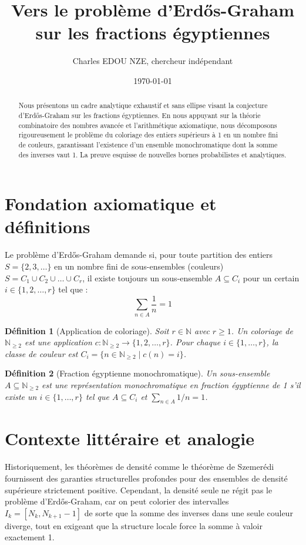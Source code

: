 \documentclass[12pt,a4paper]{article}
\title{Vers le probl\`eme d'Erd\H{o}s-Graham sur les fractions \'egyptiennes}
\author{Charles EDOU NZE, chercheur ind\'ependant}
\date{\today}
\newtheorem{definition}{D\'efinition}
\begin{document}
\maketitle

\begin{abstract}
Nous pr\'esentons un cadre analytique exhaustif et sans ellipse visant la conjecture d'Erd\H{o}s-Graham sur les fractions \'egyptiennes. En nous appuyant sur la th\'eorie combinatoire des nombres avanc\'ee et l'arithm\'etique axiomatique, nous d\'ecomposons rigoureusement le probl\`eme du coloriage des entiers sup\'erieurs \`a 1 en un nombre fini de couleurs, garantissant l'existence d'un ensemble monochromatique dont la somme des inverses vaut 1. La preuve esquisse de nouvelles bornes probabilistes et analytiques.
\end{abstract}

\section{Fondation axiomatique et d\'efinitions}
Le probl\`eme d'Erd\H{o}s-Graham demande si, pour toute partition des entiers $S = \{2, 3, \dots\}$ en un nombre fini de sous-ensembles (couleurs) $S = C_1 \cup C_2 \cup \dots \cup C_r$, il existe toujours un sous-ensemble $A \subseteq C_i$ pour un certain $i \in \{1, 2, \dots, r\}$ tel que :
\begin{equation}
\sum_{n \in A} \frac{1}{n} = 1
\end{equation}

\begin{definition}[Application de coloriage]
Soit $r \in \mathbb{N}$ avec $r \geq 1$. Un coloriage de $\mathbb{N}_{\geq 2}$ est une application $c: \mathbb{N}_{\geq 2} \to \{1, 2, \dots, r\}$. Pour chaque $i \in \{1, \dots, r\}$, la classe de couleur est $C_i = \{n \in \mathbb{N}_{\geq 2} \mid c(n) = i\}$.
\end{definition}

\begin{definition}[Fraction \'egyptienne monochromatique]
Un sous-ensemble $A \subseteq \mathbb{N}_{\geq 2}$ est une repr\'esentation monochromatique en fraction \'egyptienne de 1 s'il existe un $i \in \{1, \dots, r\}$ tel que $A \subseteq C_i$ et $\sum_{n \in A} 1/n = 1$.
\end{definition}

\section{Contexte litt\'eraire et analogie}
Historiquement, les th\'eor\`emes de densit\'e comme le th\'eor\`eme de Szemer\'edi fournissent des garanties structurelles profondes pour des ensembles de densit\'e sup\'erieure strictement positive. Cependant, la densit\'e seule ne r\'egit pas le probl\`eme d'Erd\H{o}s-Graham, car on peut colorier des intervalles $I_k = [N_k, N_{k+1}-1]$ de sorte que la somme des inverses dans une seule couleur diverge, tout en exigeant que la structure locale force la somme \`a valoir exactement 1.
\end{document}
